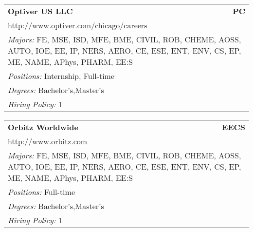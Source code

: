 \documentclass[twoside]{article}
\begin{document}
\begin{center}
\begin{multicols}{3}
\begin{FlushLeft}
\begin{minipage}{\columnwidth}
\end{minipage}
 
\begin{minipage}{\columnwidth}\begin{tabularx}{.95\columnwidth}{Xr}
                 {\Large\bf Optiver US LLC} & {\Large\bf PC}\\
    \multicolumn{2}{p{.95\columnwidth}}{\url{http://www.optiver.com/chicago/careers}}\\
    \multicolumn{2}{p{.95\columnwidth}}{\emph{Majors:} FE, MSE, ISD, MFE, BME, CIVIL, ROB, CHEME, AOSS, AUTO, IOE, EE, IP, NERS, AERO, CE, ESE, ENT, ENV, CS, EP, ME, NAME, APhys, PHARM, EE:S}\\
    \multicolumn{2}{p{.95\columnwidth}}{\emph{Positions:} Internship, Full-time}\\
    \multicolumn{2}{p{.95\columnwidth}}{\emph{Degrees:} Bachelor's,Master's}\\
    \multicolumn{2}{p{.95\columnwidth}}{\emph{Hiring Policy:} 1}\\
    \end{tabularx}
    
\end{minipage}
 
\begin{minipage}{\columnwidth}\begin{tabularx}{.95\columnwidth}{Xr}
                 {\Large\bf Orbitz Worldwide} & {\Large\bf EECS}\\
    \multicolumn{2}{p{.95\columnwidth}}{\url{http://www.orbitz.com}}\\
    \multicolumn{2}{p{.95\columnwidth}}{\emph{Majors:} FE, MSE, ISD, MFE, BME, CIVIL, ROB, CHEME, AOSS, AUTO, IOE, EE, IP, NERS, AERO, CE, ESE, ENT, ENV, CS, EP, ME, NAME, APhys, PHARM, EE:S}\\
    \multicolumn{2}{p{.95\columnwidth}}{\emph{Positions:} Full-time}\\
    \multicolumn{2}{p{.95\columnwidth}}{\emph{Degrees:} Bachelor's,Master's}\\
    \multicolumn{2}{p{.95\columnwidth}}{\emph{Hiring Policy:} 1}\\
    \end{tabularx}
    
\end{minipage}
 

\end{FlushLeft}
\end{multicols}
\end{center}
\end{document}
